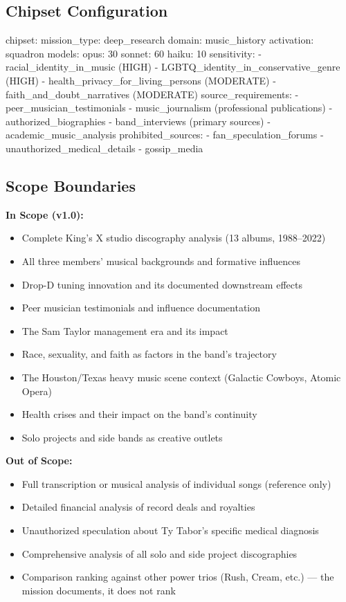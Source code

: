 \documentclass[11pt,letterpaper]{article}
\begin{document}
\subsection{Chipset Configuration}

\begin{asciibox}
chipset:
  mission_type: deep_research
  domain: music_history
  activation: squadron
  models:
    opus: 30%
    sonnet: 60%
    haiku: 10%
  sensitivity:
    - racial_identity_in_music (HIGH)
    - LGBTQ_identity_in_conservative_genre (HIGH)
    - health_privacy_for_living_persons (MODERATE)
    - faith_and_doubt_narratives (MODERATE)
  source_requirements:
    - peer_musician_testimonials
    - music_journalism (professional publications)
    - authorized_biographies
    - band_interviews (primary sources)
    - academic_music_analysis
  prohibited_sources:
    - fan_speculation_forums
    - unauthorized_medical_details
    - gossip_media
\end{asciibox}

\subsection{Scope Boundaries}

\textbf{In Scope (v1.0):}
\begin{itemize}[leftmargin=2em]
\item Complete King's X studio discography analysis (13 albums, 1988--2022)
\item All three members' musical backgrounds and formative influences
\item Drop-D tuning innovation and its documented downstream effects
\item Peer musician testimonials and influence documentation
\item The Sam Taylor management era and its impact
\item Race, sexuality, and faith as factors in the band's trajectory
\item The Houston/Texas heavy music scene context (Galactic Cowboys, Atomic Opera)
\item Health crises and their impact on the band's continuity
\item Solo projects and side bands as creative outlets
\end{itemize}

\textbf{Out of Scope:}
\begin{itemize}[leftmargin=2em]
\item Full transcription or musical analysis of individual songs (reference only)
\item Detailed financial analysis of record deals and royalties
\item Unauthorized speculation about Ty Tabor's specific medical diagnosis
\item Comprehensive analysis of all solo and side project discographies
\item Comparison ranking against other power trios (Rush, Cream, etc.) --- the mission documents, it does not rank
\end{itemize}
\end{document}
